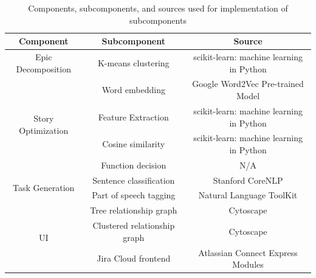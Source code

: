 \begin{table}
\centering
\caption{Components, subcomponents, and sources used for implementation of subcomponents}
\begin{tabular}{ |c|c|c| } 
\hline
\multicolumn{1}{|c|}{\textbf{Component}} & \multicolumn{1}{c|}{\textbf{Subcomponent}} & \multicolumn{1}{c|}{\textbf{Source}} \\
\hline
Epic Decomposition & K-means clustering & scikit-learn: machine learning in Python \\
\hline
\multirow{4}{*}{Story Optimization} & Word embedding & Google Word2Vec Pre-trained Model \\ 
\cline{2-3}
& Feature Extraction & scikit-learn: machine learning in Python \\ 
\cline{2-3}
& Cosine similarity & scikit-learn: machine learning in Python \\
\cline{2-3}
& Function decision &N/A \\ 
\hline
\multirow{2}{*}{Task Generation} & Sentence classification & Stanford CoreNLP \\ 
\cline{2-3}
& Part of speech tagging & Natural Language ToolKit \\ 
\hline
\multirow{3}{*}{UI} & Tree relationship graph & Cytoscape \\ 
\cline{2-3}
& Clustered relationship graph & Cytoscape \\ 
\cline{2-3}
& Jira Cloud frontend & Atlassian Connect Express Modules \\ 
\hline
\end{tabular}
\end{table}
